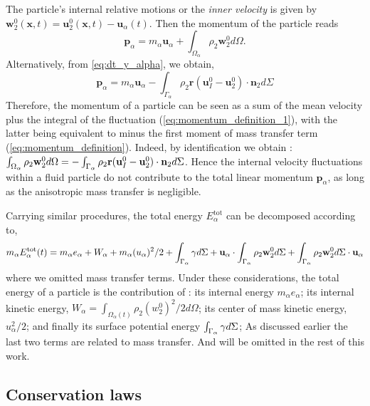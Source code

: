 The particle's internal relative motions or the \textit{inner velocity} is given by $\textbf{w}_2^0(\textbf{x},t) = \textbf{u}_2^0(\textbf{x},t) - \textbf{u}_\alpha(t)$. Then the momentum of the particle reads
\begin{equation}
    \label{eq:momentum_definition_1}
    \textbf{p}_\alpha
    = m_\alpha \textbf{u}_\alpha
    + \int_{\Omega_\alpha} \rho_2 \textbf{w}_2^0 d\Omega.
\end{equation}
Alternatively, from \eqref{eq:dt_y_alpha}, we obtain,
\begin{equation}
    \textbf{p}_\alpha
    =  m_\alpha \textbf{u}_\alpha
    - \int_{\Gamma_\alpha} \rho_2\textbf{r}(\textbf{u}_I^0 - \textbf{u}_2^0)\cdot \textbf{n}_2 d\Sigma
    \label{eq:momentum_definition}
\end{equation}
Therefore, the momentum of a particle can be seen as a sum of the mean velocity plus the integral of the fluctuation (\ref{eq:momentum_definition_1}), with the latter being equivalent to minus the first moment of mass transfer term (\ref{eq:momentum_definition}).
Indeed, by identification we obtain : $\int_{\Omega_\alpha}  \rho_2 \textbf{w}_2^0  d\Omega = - \int_{\Gamma_\alpha}   \rho_2\textbf{r} (\textbf{u}_I^0 - \textbf{u}_2^0)\cdot \textbf{n}_2  d\Sigma$. 
Hence the internal velocity fluctuations within a fluid particle do not contribute to the total linear momentum $\textbf{p}_\alpha$, as long as the anisotropic mass transfer is negligible.  

Carrying similar procedures, the total energy $E_\alpha^\text{tot}$ can be decomposed according to,
\begin{equation*}
    \label{eq:E_alpha_def}
    m_\alpha E_\alpha^\text{tot}(t) 
    = m_\alpha e_\alpha 
    + W_\alpha
    + m_\alpha (u_\alpha)^2/2
    + \int_{\Gamma_\alpha}  \gamma d\Sigma
    + \textbf{u}_\alpha \cdot  \int_{\Gamma_\alpha}   \rho_2 \textbf{w}_2^0  d\Sigma
    + \int_{\Gamma_\alpha}   \rho_2 \textbf{w}_2^0  d\Sigma \cdot \textbf{u}_\alpha 
\end{equation*}
where we omitted mass transfer terms.
Under these considerations, the total energy of a particle is the contribution of :
its internal energy $m_\alpha e_\alpha$; 
its internal kinetic energy, $W_\alpha = \int_{\Omega_\alpha(t)} \rho_2  (w_2^0)^2/2 d\Omega$;
its center of mass kinetic energy, $u_\alpha^2/2$; 
and finally its surface potential energy $\int_{\Gamma_\alpha}  \gamma d\Sigma$; 
As discussed earlier the last two terms are related to mass transfer. 
And will be omitted in the rest of this work. 

\subsection{Conservation laws}

